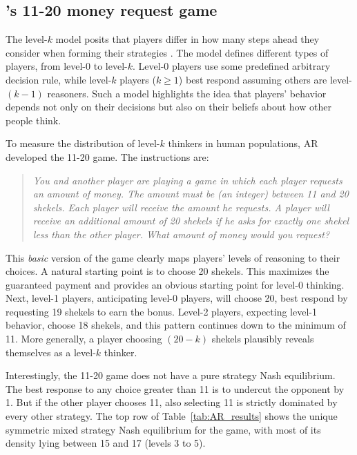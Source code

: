 \subsection{\cite{1120Arad2012}'s 11-20 money request game}
\label{sec:11-20_app}

The level-$k$ model posits that players differ in how many steps ahead they consider when forming their strategies \citep{LkNagel1995,STAHL1994,STAHL1995}.
The model defines different types of players, from level-$0$ to level-$k$. 
Level-$0$ players use some predefined arbitrary decision rule, while level-$k$ players ($k \geq 1$) best respond assuming others are level-$(k-1)$ reasoners.
Such a model highlights the idea that players' behavior depends not only on their decisions but also on their beliefs about how other people think.

To measure the distribution of level-$k$ thinkers in human populations, AR developed the 11-20 game.
The instructions are:
\begin{quote}
\vspace{-.5cm}
\singlespacing
\emph{You and another player are playing a game in which each player requests an amount of money. The amount must be (an integer) between 11 and 20 shekels.  Each player will receive the amount he requests. A player will receive an additional amount of 20 shekels if he asks for exactly one shekel less than the other player. What amount of money would you request?}
\end{quote}
This \emph{basic} version of the game clearly maps players' levels of reasoning to their choices.
A natural starting point is to choose 20 shekels.
This maximizes the guaranteed payment and provides an obvious starting point for level-0 thinking.
Next, level-1 players, anticipating level-0 players, will choose 20, best respond by requesting 19 shekels to earn the bonus. 
Level-2 players, expecting level-1 behavior, choose 18 shekels, and this pattern continues down to the minimum of 11.
More generally, a player choosing $(20-k)$ shekels plausibly reveals themselves as a level-$k$ thinker.

Interestingly, the 11-20 game does not have a pure strategy Nash equilibrium.
The best response to any choice greater than 11 is to undercut the opponent by 1.
But if the other player chooses 11, also selecting 11 is strictly dominated by every other strategy.
The top row of Table~\ref{tab:AR_results} shows the unique symmetric mixed strategy Nash equilibrium for the game, with most of its density lying between 15 and 17 (levels 3 to 5).

